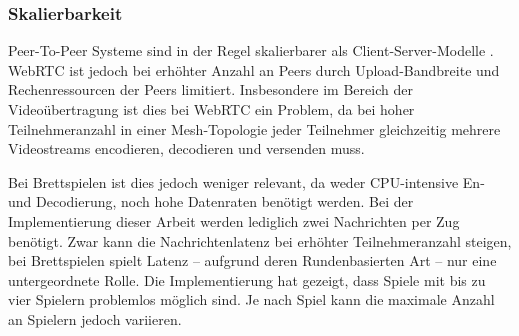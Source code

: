 \subsubsection{Skalierbarkeit}
Peer-To-Peer Systeme sind in der Regel skalierbarer als Client-Server-Modelle \cite{p2pchallenges}. WebRTC ist jedoch bei erhöhter Anzahl an Peers durch Upload-Bandbreite und Rechenressourcen der Peers limitiert. Insbesondere im Bereich der Videoübertragung ist dies bei WebRTC ein Problem, da bei hoher Teilnehmeranzahl in einer Mesh-Topologie jeder Teilnehmer gleichzeitig mehrere Videostreams encodieren, decodieren und versenden  muss.\par

Bei Brettspielen ist dies jedoch weniger relevant, da weder CPU-intensive En- und Decodierung, noch hohe Datenraten benötigt werden. Bei der Implementierung dieser Arbeit werden lediglich zwei Nachrichten per Zug benötigt. Zwar kann die Nachrichtenlatenz bei erhöhter Teilnehmeranzahl steigen, bei Brettspielen spielt Latenz -- aufgrund deren Rundenbasierten Art -- nur eine untergeordnete Rolle. Die Implementierung hat gezeigt, dass Spiele mit bis zu vier Spielern problemlos möglich sind. Je nach Spiel kann die maximale Anzahl an Spielern jedoch variieren.\par






